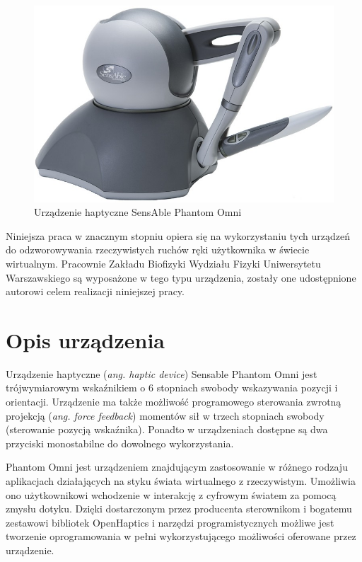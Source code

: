 \documentclass[licencjacka]{pracamgr}
\begin{document}
\begin{figure}[H]
\centering
\includegraphics[scale=0.5,center]{Sensable_Phantom_Omni}
\caption{Urządzenie haptyczne SensAble Phantom Omni}
\end{figure}

Niniejsza praca w znacznym stopniu opiera się na wykorzystaniu tych urządzeń do odzworowywania rzeczywistych ruchów ręki użytkownika w świecie wirtualnym. Pracownie Zakładu Biofizyki Wydziału Fizyki Uniwersytetu Warszawskiego są wyposażone w tego typu urządzenia, zostały one udostępnione autorowi celem realizacji niniejszej pracy.

\section{Opis urządzenia}
Urządzenie haptyczne (\textit{ang. haptic device}) Sensable Phantom Omni jest trójwymiarowym wskaźnikiem o 6 stopniach swobody wskazywania pozycji i orientacji. Urządzenie ma także możliwość programowego sterowania zwrotną projekcją (\textit{ang. force feedback}) momentów sił w trzech stopniach swobody (sterowanie pozycją wskaźnika). Ponadto w urządzeniach dostępne są dwa przyciski monostabilne do dowolnego wykorzystania.

Phantom Omni jest urządzeniem znajdującym zastosowanie w różnego rodzaju aplikacjach działających na styku świata wirtualnego z rzeczywistym. Umożliwia ono użytkownikowi wchodzenie w interakcję z cyfrowym światem za pomocą zmysłu dotyku. Dzięki dostarczonym przez producenta sterownikom i bogatemu zestawowi bibliotek OpenHaptics i narzędzi programistycznych możliwe jest tworzenie oprogramowania w pełni wykorzystującego możliwości oferowane przez urządzenie.
\end{document}
